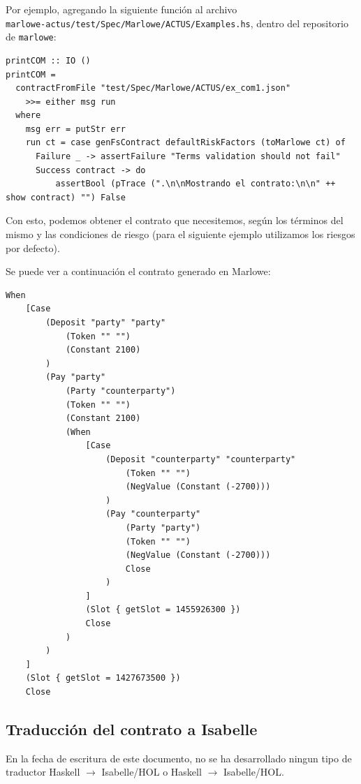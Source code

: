 \documentclass[12pt]{book}
\begin{document}
Por ejemplo, agregando la siguiente función al archivo\\ \texttt{marlowe-actus/test/Spec/Marlowe/ACTUS/Examples.hs}, dentro del repositorio de \texttt{marlowe}:

\begin{lstlisting}[style=Haskell-cardano, caption=Función para imprimir contratos en Marlowe.]
printCOM :: IO ()
printCOM =
  contractFromFile "test/Spec/Marlowe/ACTUS/ex_com1.json"
    >>= either msg run
  where
    msg err = putStr err
    run ct = case genFsContract defaultRiskFactors (toMarlowe ct) of
      Failure _ -> assertFailure "Terms validation should not fail"
      Success contract -> do
          assertBool (pTrace (".\n\nMostrando el contrato:\n\n" ++ show contract) "") False
\end{lstlisting}

Con esto, podemos obtener el contrato que necesitemos, según los términos del mismo y las condiciones de riesgo (para el siguiente ejemplo utilizamos los riesgos por defecto).

Se puede ver a continuación el contrato generado en Marlowe:

\begin{lstlisting}[style=Haskell-cardano, language=Marlowe, caption=Contrato COM en Marlowe.]
When
    [Case
        (Deposit "party" "party"
            (Token "" "")
            (Constant 2100)
        )
        (Pay "party"
            (Party "counterparty")
            (Token "" "")
            (Constant 2100)
            (When
                [Case
                    (Deposit "counterparty" "counterparty"
                        (Token "" "")
                        (NegValue (Constant (-2700)))
                    )
                    (Pay "counterparty"
                        (Party "party")
                        (Token "" "")
                        (NegValue (Constant (-2700))) 
                        Close
                    )
                ]
                (Slot { getSlot = 1455926300 })
                Close
            )
        )
    ]
    (Slot { getSlot = 1427673500 })
    Close
\end{lstlisting}



\subsection{Traducción del contrato a Isabelle}

En la fecha de escritura de este documento, no se ha desarrollado ningun tipo de traductor Haskell $\longrightarrow$ Isabelle/HOL o Haskell $\longrightarrow$ Isabelle/HOL.\@
\end{document}
